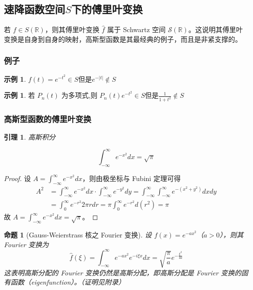 \documentclass[12pt,a4paper]{article}
\theoremstyle{plain}
\newtheorem{lemma}[theorem]{引理}
\newtheorem{proposition}[theorem]{命题}
\theoremstyle{definition}
\newtheorem{example}[theorem]{示例}
\theoremstyle{remark}
\begin{document}
\subsection{速降函数空间$S$下的傅里叶变换}
若 $f \in S(\mathbb{R})$，则其傅里叶变换 $\hat{f}$ 属于 Schwartz 空间 $\mathcal{S}(\mathbb{R})$。这说明其傅里叶变换是自身到自身的映射，高斯型函数是其最经典的例子，而且是非紧支撑的。

\subsubsection{例子}
\begin{example}
\(f(t)=e^{-t^{2}} \in S \)但是\(e^{-|t|} \notin S\)
\end{example}

\begin{example}
若 \(P_{n}(t)\) 为多项式,则 \(P_{n}(t)e^{-t^{2}} \in S\)但是\(\frac{1}{1 + t^{2}} \notin S\)
\end{example}


\subsubsection{高斯型函数的傅里叶变换}
\begin{lemma}高斯积分
	
	\[
	\int_{-\infty}^{\infty} e^{-x^2} dx = \sqrt{\pi}
	\]
\end{lemma}

\begin{proof}
 设 \( A = \int_{-\infty}^{\infty} e^{-x^2} dx \)，则由极坐标与 Fubini 定理可得
\[
\begin{aligned}
	A^2 &= \int_{-\infty}^{\infty} e^{-x^2} dx \cdot \int_{-\infty}^{\infty} e^{-y^2} dy = \int_{-\infty}^{\infty} \int_{-\infty}^{\infty} e^{-(x^2 + y^2)} dx dy \\
	&= \int_{0}^{\infty} e^{-r^2} 2\pi r dr = \pi \int_{0}^{\infty} e^{-r^2} d(r^2) = \pi
\end{aligned}
\]
故 \( A = \int_{-\infty}^{\infty} e^{-x^2} dx = \sqrt{\pi} \)。
\end{proof}

\begin{proposition}[Gauss-Weierstrass 核之 Fourier 变换]
	设 \( f(x) = e^{-a x^2} \)（\( a > 0 \)），则其 Fourier 变换为
	\[
	\widehat{f}(\xi) = \int_{-\infty}^{\infty} e^{-a x^2} e^{-i \xi x} dx = \sqrt{\frac{\pi}{a}} e^{-\frac{\xi^2}{4a}}
	\]
	这表明高斯分配的 Fourier 变换仍然是高斯分配，即高斯分配是 Fourier 变换的固有函数（eigenfunction）。（证明见附录）
\end{proposition}
\end{document}
